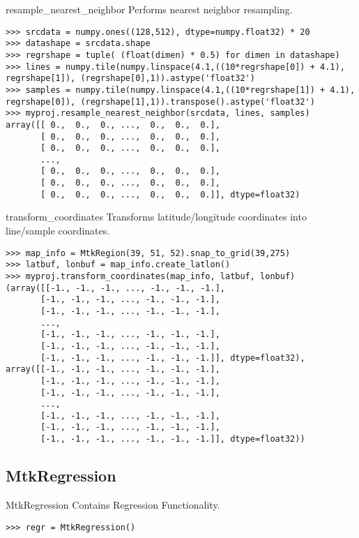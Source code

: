 \documentclass{howto}
\begin{document}
\begin{methoddesc}{resample_nearest_neighbor}{}
    Performs nearest neighbor resampling.

\begin{verbatim}
>>> srcdata = numpy.ones((128,512), dtype=numpy.float32) * 20
>>> datashape = srcdata.shape
>>> regrshape = tuple( (float(dimen) * 0.5) for dimen in datashape)
>>> lines = numpy.tile(numpy.linspace(4.1,((10*regrshape[0]) + 4.1), regrshape[1]), (regrshape[0],1)).astype('float32')
>>> samples = numpy.tile(numpy.linspace(4.1,((10*regrshape[1]) + 4.1), regrshape[0]), (regrshape[1],1)).transpose().astype('float32')
>>> myproj.resample_nearest_neighbor(srcdata, lines, samples)
array([[ 0.,  0.,  0., ...,  0.,  0.,  0.],
       [ 0.,  0.,  0., ...,  0.,  0.,  0.],
       [ 0.,  0.,  0., ...,  0.,  0.,  0.],
       ...,
       [ 0.,  0.,  0., ...,  0.,  0.,  0.],
       [ 0.,  0.,  0., ...,  0.,  0.,  0.],
       [ 0.,  0.,  0., ...,  0.,  0.,  0.]], dtype=float32)
\end{verbatim}
\end{methoddesc}

\begin{methoddesc}{transform_coordinates}{}
  Transforms latitude/longitude coordinates into line/sample coordinates.

\begin{verbatim}
>>> map_info = MtkRegion(39, 51, 52).snap_to_grid(39,275)
>>> latbuf, lonbuf = map_info.create_latlon()
>>> myproj.transform_coordinates(map_info, latbuf, lonbuf)
(array([[-1., -1., -1., ..., -1., -1., -1.],
       [-1., -1., -1., ..., -1., -1., -1.],
       [-1., -1., -1., ..., -1., -1., -1.],
       ...,
       [-1., -1., -1., ..., -1., -1., -1.],
       [-1., -1., -1., ..., -1., -1., -1.],
       [-1., -1., -1., ..., -1., -1., -1.]], dtype=float32), array([[-1., -1., -1., ..., -1., -1., -1.],
       [-1., -1., -1., ..., -1., -1., -1.],
       [-1., -1., -1., ..., -1., -1., -1.],
       ...,
       [-1., -1., -1., ..., -1., -1., -1.],
       [-1., -1., -1., ..., -1., -1., -1.],
       [-1., -1., -1., ..., -1., -1., -1.]], dtype=float32))
\end{verbatim}
\end{methoddesc}

\subsection{MtkRegression \label{mtkregression}}

\begin{classdesc*}{MtkRegression}
  Contains Regression Functionality.

\begin{verbatim}
>>> regr = MtkRegression()
\end{verbatim}
\end{classdesc*}
\end{document}
